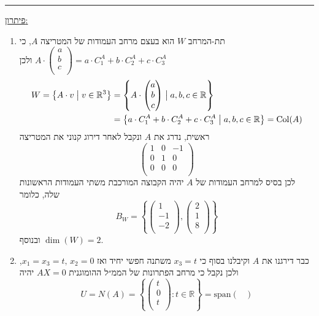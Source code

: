 \documentclass[12pt, a4paper]{article}
\newcommand{\rr}{\mathbb{R}}
\begin{document}
\begin{enumerate}
    \thirdQ
    \noindent\rule{\textwidth-30pt}{0.4pt}
    \underline{פיתרון:}
\begin{enumerate}
    \item 
תת-המרחב
$W$
הוא בעצם מרחב העמודות של המטריצה
$A$,
כי
$A\cdot\begin{pmatrix}
    a\\b\\c\\
\end{pmatrix}=a\cdot C^A_1+ b\cdot C_2^A+c\cdot C_3^A$
ולכן
\begin{align*}W=\left\{
A\cdot v \bigm| v\in\rr^3
\right\}&=
\left\{
A\cdot\begin{pmatrix}
    a\\b\\c\\
\end{pmatrix}
\bigm| a,b,c\in\rr
\right\}\\&=
\left\{
a\cdot C^A_1+ b\cdot C_2^A+c\cdot C_3^A
\bigm|
a,b,c\in\rr
\right\}=\mathrm{Col}(A)
\end{align*}
ראשית, נדרג את
$A$
ונקבל לאחר דירוג קנוני את המטריצה
$$\begin{pmatrix}
    1&0&-1\\
    0&1&0\\
    0&0&0\\
\end{pmatrix}$$
לכן בסיס למרחב העמודות של
$A$
יהיה הקבוצה המורכבת משתי העמודות הראשונות שלה, כלומר
$$B_{W}=\left\{
\begin{pmatrix}
    1\\-1\\-2\\
\end{pmatrix},
\begin{pmatrix}
    2\\1\\8\\
\end{pmatrix}
\right\}$$
ובנוסף
$\dim(W)=2$.
    \item 
כבר דירגנו את
$A$
וקיבלנו בסוף כי
$x_3=t$
משתנה חפשי יחיד ואז
$x_1=x_3=t, \, x_2=0$,
ולכן נקבל כי מרחב הפתרונות של הממ״ל ההומוגנית
$AX=0$
יהיה
$$U=N(A)=\left\{
\begin{pmatrix}
    t\\0\\t\\
\end{pmatrix}: t\in\rr
\right\}=\mathrm{span}
\begin{pmatrix}

\end{pmatrix}$$
\end{enumerate}
\end{enumerate}
\end{document}
